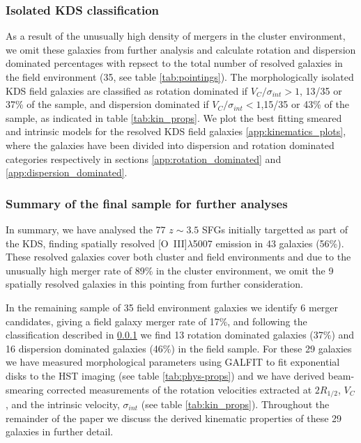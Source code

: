 \documentclass[fleqn,usenatbib]{mn2e}
\begin{document}
\subsubsection{Isolated KDS classification}\label{subsubsection:isolated_classification}
As a result of the unusually high density of mergers in the cluster environment, we omit these galaxies from further analysis and calculate rotation and dispersion dominated percentages with repsect to the total number of resolved galaxies in the field environment (35, see table \ref{tab:pointings}).
The morphologically isolated KDS field galaxies are classified as rotation dominated if $V_{C}/\sigma_{int} > 1$, 13/35 or 37\% of the sample, and dispersion dominated if $V_{C}/\sigma_{int} < 1$,15/35 or 43\% of the sample, as indicated in table \ref{tab:kin_props}.
We plot the best fitting smeared and intrinsic models for the resolved KDS field galaxies \cref{app:kinematics_plots}, where the galaxies have been divided into dispersion and rotation dominated categories respectively in sections \cref{app:rotation_dominated} and \cref{app:dispersion_dominated}.

\subsubsection{Summary of the final sample for further analyses}\label{subsubsec:kin_sample_summary}
In summary, we have analysed the 77 $z\sim3.5$ SFGs initially targetted as part of the KDS, finding spatially resolved [O~{\sc III}]$\lambda$5007 emission in 43 galaxies (56\%).
These resolved galaxies cover both cluster and field environments and due to the unusually high merger rate of 89\% in the cluster environment, we omit the 9 spatially resolved galaxies in this pointing from further consideration.

In the remaining sample of 35 field environment galaxies we identify 6 merger candidates, giving a field galaxy merger rate of 17\%, and following the classification described in \cref{subsubsection:isolated_classification} we find 13 rotation dominated galaxies (37\%) and 16 dispersion dominated galaxies (46\%) in the field sample.
For these 29 galaxies we have measured morphological parameters using GALFIT to fit exponential disks to the HST imaging (see table \ref{tab:phys-props}) and we have derived beam-smearing corrected measurements of the rotation velocities extracted at $2R_{1/2}$, $V_{C}$, and the intrinsic velocity, $\sigma_{int}$ (see table \ref{tab:kin_props}).
Throughout the remainder of the paper we discuss the derived kinematic properties of these 29 galaxies in further detail.
\end{document}
